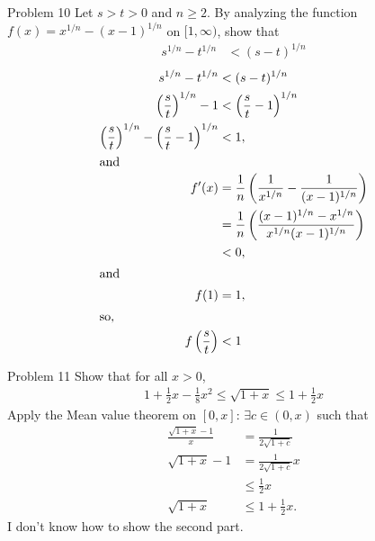 \documentclass[8pt]{extarticle}
\begin{document}
  \begin{problem}{Problem 10}
    Let $s > t > 0$ and $n \geq 2$. By analyzing the function $f(x) = x^{1/n} - (x-1)^{1/n}$ on $[1,\infty)$, show that
    \begin{align*}
      s^{1/n} - t^{1/n} &< (s-t)^{1/n}
    \end{align*}
    \tcblower
    \begin{align*}
      s^{1/n} - t^{1/n} &< (s-t)^{1/n}\\
      \left(\frac{s}{t}\right)^{1/n}-1 &< \left(\frac{s}{t}-1\right)^{1/n}\\
      \left(\frac{s}{t}\right)^{1/n}-\left(\frac{s}{t}-1\right)^{1/n} &< 1,\\
      \shortintertext{and}
      f'(x) &= \frac{1}{n}\left(\frac{1}{x^{1/n}}-\frac{1}{(x-1)^{1/n}}\right)\\
            &= \frac{1}{n}\left(\frac{(x-1)^{1/n}-x^{1/n}}{x^{1/n}(x-1)^{1/n}}\right)\\
            &< 0,\\
            \shortintertext{and}
      f(1) &= 1,\\
      \shortintertext{so,}
      f\left(\frac{s}{t}\right)&< 1
    \end{align*}
  \end{problem}
  \begin{problem}{Problem 11}
    Show that for all $x > 0$,
    \begin{align*}
      1 + \frac{1}{2}x - \frac{1}{8}x^2 \leq \sqrt{1+x} \leq 1 + \frac{1}{2}x
    \end{align*}
    \tcblower
    Apply the Mean value theorem on $[0,x]$: $\exists c \in (0,x)$ such that
    \begin{align*}
      \frac{\sqrt{1+x}-1}{x} &=\frac{1}{2\sqrt{1+c}}\\
      \sqrt{1+x}-1 &= \frac{1}{2\sqrt{1+c}}x\\
                   &\leq \frac{1}{2}x\tag*{$c \geq 0$}\\
      \sqrt{1+x} &\leq 1 + \frac{1}{2}x.
    \end{align*}
    I don't know how to show the second part.
  \end{problem}
\end{document}
